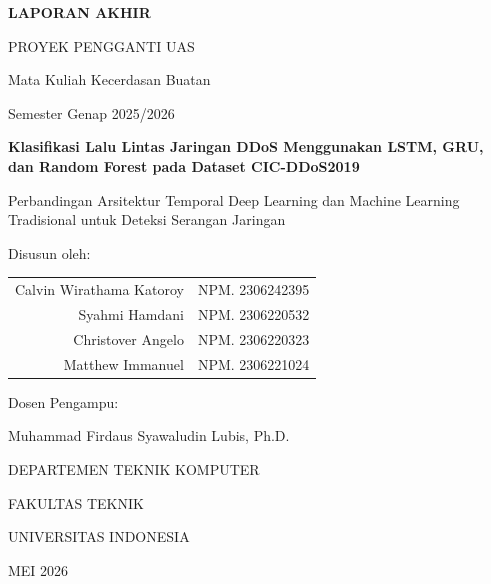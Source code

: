 \documentclass[11pt,a4paper,oneside]{report}
\begin{document}
\begin{titlepage}
\centering
\vspace*{1cm}

{\Large\bfseries LAPORAN AKHIR \par}
{\large PROYEK PENGGANTI UAS \par}
\vspace{0.3cm}
{\large Mata Kuliah Kecerdasan Buatan \par}
{\large Semester Genap 2025/2026 \par}

\vspace{1.5cm}

{\LARGE\bfseries Klasifikasi Lalu Lintas Jaringan DDoS Menggunakan LSTM, GRU, dan Random Forest pada Dataset CIC-DDoS2019 \par}
\vspace{0.5cm}
{\large Perbandingan Arsitektur Temporal Deep Learning dan Machine Learning Tradisional untuk Deteksi Serangan Jaringan \par}

\vspace{2cm}

{\large Disusun oleh: \par}
\vspace{0.5cm}
\begin{tabular}{rl}
Calvin Wirathama Katoroy & NPM. 2306242395 \\
Syahmi Hamdani           & NPM. 2306220532 \\
Christover Angelo        & NPM. 2306220323 \\
Matthew Immanuel         & NPM. 2306221024 \\
\end{tabular}

\vspace{1.5cm}

{\large Dosen Pengampu: \par}
{\large Muhammad Firdaus Syawaludin Lubis, Ph.D. \par}

\vfill

{\large DEPARTEMEN TEKNIK KOMPUTER \par}
{\large FAKULTAS TEKNIK \par}
{\large UNIVERSITAS INDONESIA \par}
{\large MEI 2026 \par}
\end{titlepage}
\end{document}
